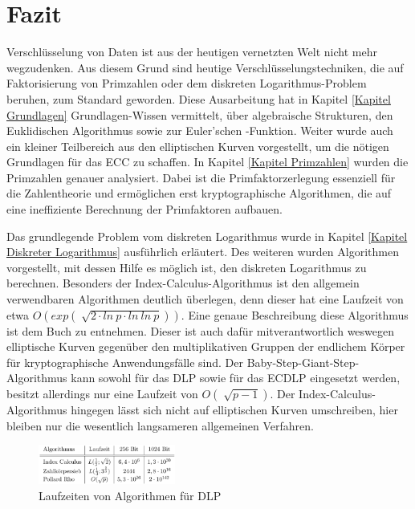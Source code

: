 \section{Fazit}
	Verschlüsselung von Daten ist aus der heutigen vernetzten Welt nicht mehr wegzudenken. Aus diesem Grund sind heutige Verschlüsselungstechniken, die auf Faktorisierung von Primzahlen oder dem diskreten Logarithmus-Problem beruhen, zum Standard geworden. Diese Ausarbeitung hat in Kapitel \ref{Kapitel Grundlagen} Grundlagen-Wissen vermittelt, über algebraische Strukturen, den Euklidischen Algorithmus sowie zur Euler’schen \myPhi -Funktion. Weiter wurde auch ein kleiner Teilbereich aus den elliptischen Kurven vorgestellt, um die nötigen Grundlagen für das ECC zu schaffen. In Kapitel \ref{Kapitel Primzahlen} wurden die Primzahlen genauer analysiert. Dabei ist die Primfaktorzerlegung essenziell für die Zahlentheorie und ermöglichen erst kryptographische Algorithmen, die auf eine ineffiziente Berechnung der Primfaktoren aufbauen.
	
	Das grundlegende Problem vom diskreten Logarithmus wurde in Kapitel \ref{Kapitel Diskreter Logarithmus} ausführlich erläutert. Des weiteren wurden Algorithmen vorgestellt, mit dessen Hilfe es möglich ist, den diskreten Logarithmus zu berechnen. Besonders der Index-Calculus-Algorithmus ist den allgemein verwendbaren Algorithmen deutlich überlegen, denn dieser hat eine Laufzeit von etwa $O(exp(\sqrt[]{2 \cdot ln~p \cdot ln~ln~p}))$. Eine genaue Beschreibung diese Algorithmus ist dem Buch \cite{Einfuehrung:in:die:Kryptographie} zu entnehmen. Dieser ist auch dafür mitverantwortlich weswegen elliptische Kurven gegenüber den multiplikativen Gruppen der endlichem Körper für kryptographische Anwendungsfälle  sind. Der Baby-Step-Giant-Step-Algorithmus kann sowohl für das DLP sowie für das ECDLP eingesetzt werden, besitzt allerdings nur eine Laufzeit von $O(\sqrt[]{p-1})$. Der Index-Calculus-Algorithmus hingegen lässt sich nicht auf elliptischen Kurven umschreiben, hier bleiben nur die wesentlich langsameren allgemeinen Verfahren.\cite{Mathematisch:fuer:fortgeschrittene:Anfaenger}

	\begin{figure}
		\centering
		\includegraphics[width=0.4\textwidth]{includes/images/LaufzeitenDLP.PNG}
		\caption{Laufzeiten von Algorithmen für DLP~\cite{DLP:ECDLP:Probleme:und:Loesungen}}
		\label{fig_LaufzeitenDLP}
	\end{figure}
	
